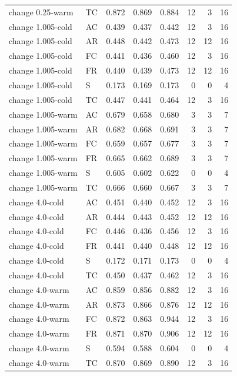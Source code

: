 \begin{longtable}{llrrrrrr}
change 0.25-warm & TC & 0.872 & 0.869 & 0.884 & 12 & 3 & 16\\
change 1.005-cold & AC & 0.439 & 0.437 & 0.442 & 12 & 3 & 16\\
change 1.005-cold & AR & 0.448 & 0.442 & 0.473 & 12 & 12 & 16\\
change 1.005-cold & FC & 0.441 & 0.436 & 0.460 & 12 & 3 & 16\\
change 1.005-cold & FR & 0.440 & 0.439 & 0.473 & 12 & 12 & 16\\
change 1.005-cold & S & 0.173 & 0.169 & 0.173 & 0 & 0 & 4\\
change 1.005-cold & TC & 0.447 & 0.441 & 0.464 & 12 & 3 & 16\\
change 1.005-warm & AC & 0.679 & 0.658 & 0.680 & 3 & 3 & 7\\
change 1.005-warm & AR & 0.682 & 0.668 & 0.691 & 3 & 3 & 7\\
change 1.005-warm & FC & 0.659 & 0.657 & 0.677 & 3 & 3 & 7\\
change 1.005-warm & FR & 0.665 & 0.662 & 0.689 & 3 & 3 & 7\\
change 1.005-warm & S & 0.605 & 0.602 & 0.622 & 0 & 0 & 4\\
change 1.005-warm & TC & 0.666 & 0.660 & 0.667 & 3 & 3 & 7\\
change 4.0-cold & AC & 0.451 & 0.440 & 0.452 & 12 & 3 & 16\\
change 4.0-cold & AR & 0.444 & 0.443 & 0.452 & 12 & 12 & 16\\
change 4.0-cold & FC & 0.446 & 0.436 & 0.456 & 12 & 3 & 16\\
change 4.0-cold & FR & 0.441 & 0.440 & 0.448 & 12 & 12 & 16\\
change 4.0-cold & S & 0.172 & 0.171 & 0.173 & 0 & 0 & 4\\
change 4.0-cold & TC & 0.450 & 0.437 & 0.462 & 12 & 3 & 16\\
change 4.0-warm & AC & 0.859 & 0.856 & 0.882 & 12 & 3 & 16\\
change 4.0-warm & AR & 0.873 & 0.866 & 0.876 & 12 & 12 & 16\\
change 4.0-warm & FC & 0.872 & 0.863 & 0.944 & 12 & 3 & 16\\
change 4.0-warm & FR & 0.871 & 0.870 & 0.906 & 12 & 12 & 16\\
change 4.0-warm & S & 0.594 & 0.588 & 0.604 & 0 & 0 & 4\\
change 4.0-warm & TC & 0.870 & 0.869 & 0.890 & 12 & 3 & 16\\
\bottomrule\end{longtable}
